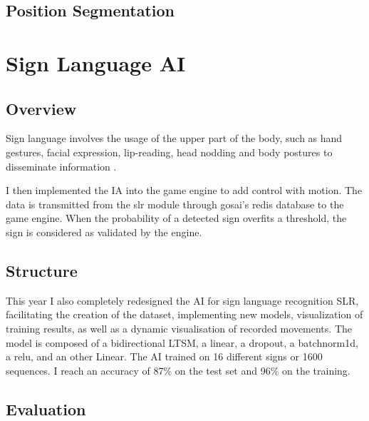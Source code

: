 \subsection{Position Segmentation}

\section{Sign Language AI}

\subsection{Overview}

Sign language involves the usage of the upper part of the body, such as hand gestures, facial expression, lip-reading, head nodding and body postures to disseminate information \cite{adeyanju2021machine}.

I then implemented the IA into the game engine to add control with motion. The data is transmitted from the slr module through gosai’s redis database to the game engine. When the probability of a detected sign overfits a threshold, the sign is considered as validated by the engine.

\subsection{Structure}

This year I also completely redesigned the AI for sign language recognition SLR, facilitating the creation of the dataset, implementing new models, visualization of training results, as well as a dynamic visualisation of recorded movements. The model is composed of a bidirectional LTSM, a linear, a dropout, a batchnorm1d, a relu, and an other Linear. The AI trained on 16 different signs or 1600 sequences. I reach an accuracy of 87\% on the test set and 96\% on the training.


\subsection{Evaluation}


